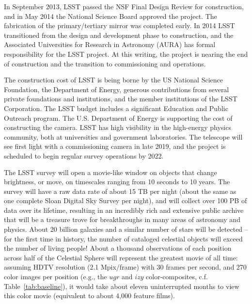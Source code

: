 In September 2013, LSST passed the NSF Final Design Review for construction,
and in May 2014 the National Science Board approved the project.
The fabrication of the primary/tertiary mirror was completed early.
In 2014 LSST transitioned from the design and development phase to
construction, and the Associated Universities for Research in
Astronomy (AURA) has formal responsibility for the LSST project.  At
this writing,  the project is nearing the end of construction and the transition to
commissioning and operations.

The construction cost of LSST is being borne by the US National Science
Foundation, the Department of Energy, generous contributions from several
private foundations and institutions, and the member institutions of the
LSST Corporation. The LSST budget includes a significant Education and
Public Outreach program.
The U.S. Department of Energy is supporting the cost of constructing the
camera. LSST has high visibility in the high-energy physics community,
both at universities and government laboratories. The telescope will
see first light with a commissioning camera in late 2019, and the
project is scheduled to begin regular survey operations by 2022.

The LSST survey will open a movie-like window on objects that
change brightness, or move, on timescales ranging from 10 seconds to 10 years.
The survey will have a raw data rate of about 15 TB per night (about the same as one
complete Sloan Digital Sky Survey per night), and will collect over 100 PB
of data over its lifetime, resulting in an incredibly rich and extensive
public archive that will be a treasure trove for breakthroughs in many areas
of astronomy and physics. About 20 billion galaxies and a similar number of stars
will be detected -- for the first time in history, the number of cataloged
celestial objects will exceed the number of living people! About a thousand
observations of each position across half of the Celestial Sphere will
represent the greatest movie of all time: assuming HDTV resolution (2.1
Mpix/frame) with 30 frames per second, and 270 color images per position
(e.g., the $ugr$ and $izy$ color-composites, c.f. Table~\ref{tab:baseline}), it would take
about eleven uninterrupted months to view this color movie (equivalent
to about 4,000 feature films).



